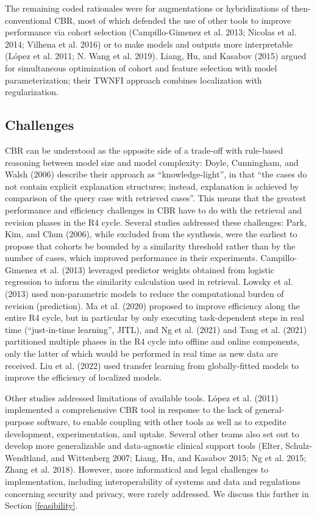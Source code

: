 \documentclass{article}
\begin{document}
The remaining coded rationales were for augmentations or hybridizations
of then-conventional CBR, most of which defended the use of other tools
to improve performance via cohort selection (Campillo-Gimenez et al.
2013; Nicolas et al. 2014; Vilhena et al. 2016) or to make models and
outputs more interpretable (López et al. 2011; N. Wang et al. 2019).
Liang, Hu, and Kasabov (2015) argued for simultaneous optimization of
cohort and feature selection with model parameterization; their TWNFI
approach combines localization with regularization.

\hypertarget{challenges}{%
\subsection{Challenges}\label{challenges}}

CBR can be understood as the opposite side of a trade-off with
rule-based reasoning between model size and model complexity: Doyle,
Cunningham, and Walsh (2006) describe their approach as
``knowledge-light'', in that ``the cases do not contain explicit
explanation structures; instead, explanation is achieved by comparison
of the query case with retrieved cases''. This means that the greatest
performance and efficiency challenges in CBR have to do with the
retrieval and revision phases in the R4 cycle. Several studies addressed
these challenges: Park, Kim, and Chun (2006), while excluded from the
synthesis, were the earliest to propose that cohorts be bounded by a
similarity threshold rather than by the number of cases, which improved
performance in their experiments. Campillo-Gimenez et al. (2013)
leveraged predictor weights obtained from logistic regression to inform
the similarity calculation used in retrieval. Lowsky et al. (2013) used
non-parametric models to reduce the computational burden of revision
(prediction). Ma et al. (2020) proposed to improve efficiency along the
entire R4 cycle, but in particular by only executing task-dependent
steps in real time (``just-in-time learning'', JITL), and Ng et al.
(2021) and Tang et al. (2021) partitioned multiple phases in the R4
cycle into offline and online components, only the latter of which would
be performed in real time as new data are received. Liu et al. (2022)
used transfer learning from globally-fitted models to improve the
efficiency of localized models.

Other studies addressed limitations of available tools. López et al.
(2011) implemented a comprehensive CBR tool in response to the lack of
general-purpose software, to enable coupling with other tools as well as
to expedite development, experimentation, and uptake. Several other
teams also set out to develop more generalizable and data-agnostic
clinical support tools (Elter, Schulz-Wendtland, and Wittenberg 2007;
Liang, Hu, and Kasabov 2015; Ng et al. 2015; Zhang et al. 2018).
However, more informatical and legal challenges to implementation,
including interoperability of systems and data and regulations
concerning security and privacy, were rarely addressed. We discuss this
further in Section \ref{feasibility}.
\end{document}
